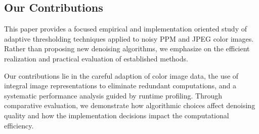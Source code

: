 \subsection{Our Contributions}\label{subsec:contributions}

This paper provides a focused empirical and implementation oriented study of adaptive thresholding techniques applied to noisy PPM and JPEG color images.
Rather than proposing new denoising algorithms, we emphasize on the efficient realization and practical evaluation of established methods.

Our contributions lie in the careful adaption of color image data, the use of integral image representations to eliminate redundant computations, and a systematic performance analysis guided by runtime profiling.
Through comparative evaluation, we demonstrate how algorithmic choices affect denoising quality and how the implementation decisions impact the computational efficiency. 




